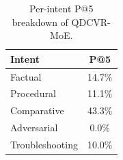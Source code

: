 \begin{table}[t]\centering
\caption{Per-intent P@5 breakdown of QDCVR-MoE.}
\label{tab:intent}
\begin{tabular}{lc}\toprule
Intent & P@5 \\ \midrule
Factual         & 14.7\% \\
Procedural      & 11.1\% \\
Comparative     & 43.3\% \\
Adversarial     & 0.0\% \\
Troubleshooting & 10.0\% \\
\bottomrule\end{tabular}\end{table}